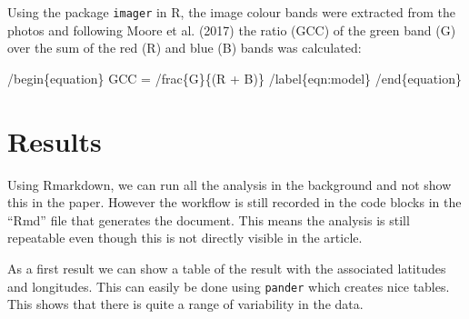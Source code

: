\documentclass[]{elsarticle} %
\begin{document}
Using the package \texttt{imager} in R, the image colour bands were
extracted from the photos and following Moore et al. (2017) the ratio
(GCC) of the green band (G) over the sum of the red (R) and blue (B)
bands was calculated:

/begin\{equation\} GCC = /frac\{G\}\{(R + B)\} /label\{eqn:model\}
/end\{equation\}

\section{Results}\label{results}

Using Rmarkdown, we can run all the analysis in the background and not
show this in the paper. However the workflow is still recorded in the
code blocks in the ``Rmd'' file that generates the document. This means
the analysis is still repeatable even though this is not directly
visible in the article.

As a first result we can show a table of the result with the associated
latitudes and longitudes. This can easily be done using \texttt{pander}
which creates nice tables. This shows that there is quite a range of
variability in the data.
\end{document}
